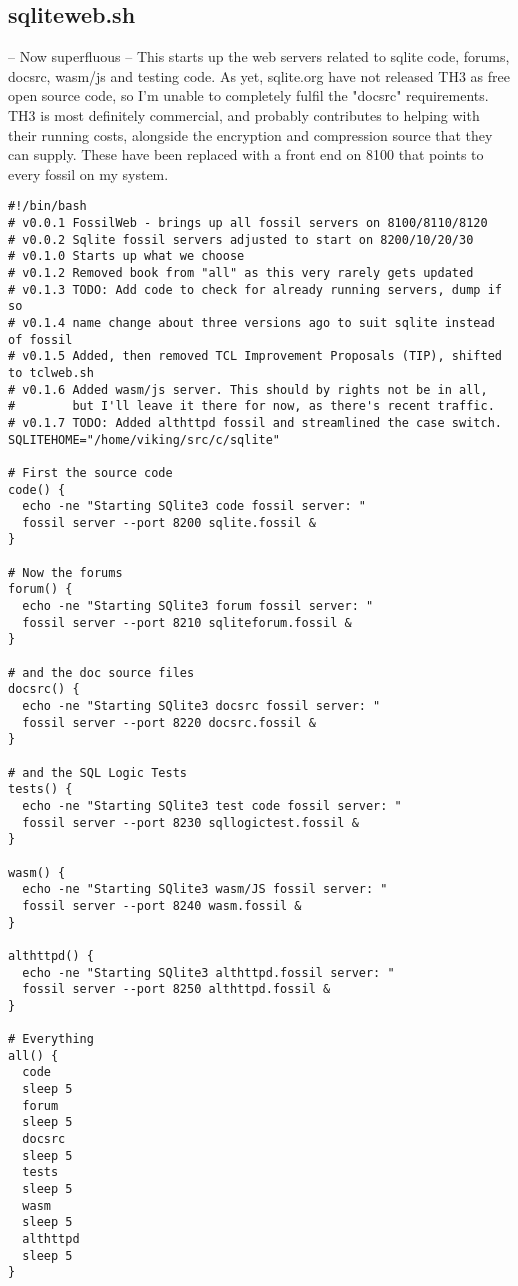 \documentclass[11pt]{article}
\begin{document}
\subsection*{sqliteweb.sh}
\label{sec:orge60e3e9}
-- Now superfluous --
This starts up the web servers related to sqlite code, forums, docsrc, wasm/js and testing code. As yet,
sqlite.org have not released TH3 as free open source code, so I'm unable to completely fulfil
the "docsrc" requirements. TH3 is most definitely commercial, and probably contributes to helping
with their running costs, alongside the encryption and compression source that they can supply.
These have been replaced with a front end on 8100 that points to every fossil on my system.

\begin{verbatim}
#!/bin/bash
# v0.0.1 FossilWeb - brings up all fossil servers on 8100/8110/8120
# v0.0.2 Sqlite fossil servers adjusted to start on 8200/10/20/30
# v0.1.0 Starts up what we choose
# v0.1.2 Removed book from "all" as this very rarely gets updated
# v0.1.3 TODO: Add code to check for already running servers, dump if so
# v0.1.4 name change about three versions ago to suit sqlite instead of fossil
# v0.1.5 Added, then removed TCL Improvement Proposals (TIP), shifted to tclweb.sh
# v0.1.6 Added wasm/js server. This should by rights not be in all,
#        but I'll leave it there for now, as there's recent traffic.
# v0.1.7 TODO: Added althttpd fossil and streamlined the case switch.
SQLITEHOME="/home/viking/src/c/sqlite"

# First the source code
code() {
  echo -ne "Starting SQlite3 code fossil server: "
  fossil server --port 8200 sqlite.fossil &
}

# Now the forums
forum() {
  echo -ne "Starting SQlite3 forum fossil server: "
  fossil server --port 8210 sqliteforum.fossil &
}

# and the doc source files
docsrc() {
  echo -ne "Starting SQlite3 docsrc fossil server: "
  fossil server --port 8220 docsrc.fossil &
}

# and the SQL Logic Tests
tests() {
  echo -ne "Starting SQlite3 test code fossil server: "
  fossil server --port 8230 sqllogictest.fossil &
}

wasm() {
  echo -ne "Starting SQlite3 wasm/JS fossil server: "
  fossil server --port 8240 wasm.fossil &
}

althttpd() {
  echo -ne "Starting SQlite3 althttpd.fossil server: "
  fossil server --port 8250 althttpd.fossil &
}

# Everything
all() {
  code
  sleep 5
  forum
  sleep 5
  docsrc
  sleep 5
  tests
  sleep 5
  wasm
  sleep 5
  althttpd
  sleep 5
}


\end{verbatim}
\end{document}
